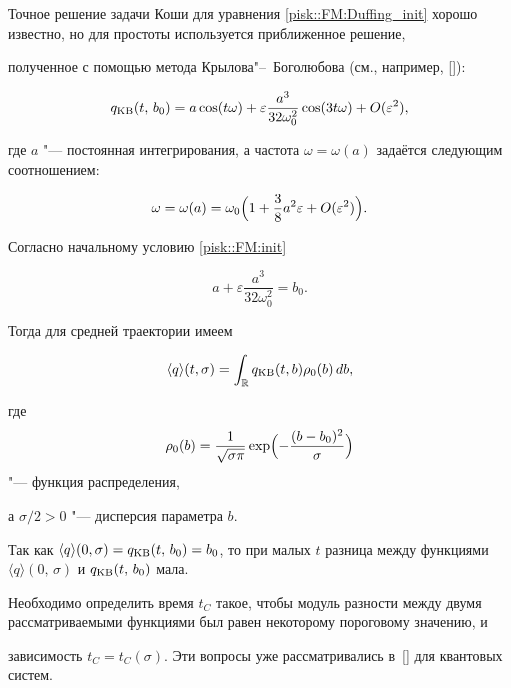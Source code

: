 Точное решение задачи Коши для уравнения \eqref{pisk::FM:Duffing_init} хорошо известно, но для простоты используется приближенное решение,

полученное с помощью метода Крылова"--~Боголюбова (см., например, []):

$$

q_{\rm KB}(t,\, b_0) = a\cos(t \omega) + \varepsilon \dfrac{a^3}{32\omega_0^2}\cos(3 t \omega) + O(\varepsilon^2),

$$

где $a$ "--- постоянная интегрирования, а частота $\omega = \omega (a)$ задаётся следующим соотношением:

$$

\omega=\omega(a) = \omega_0\Bigl(1+\dfrac3 8 a^2\varepsilon + O(\varepsilon^2)\Bigr).

$$



Согласно начальному условию \eqref{pisk::FM:init}

\begin{equation}

\label{pisk::FM:cubic}

a + \varepsilon \dfrac{a^3}{32\omega_0^2} = b_0.

\end{equation}

Тогда для средней траектории имеем

\begin{equation}

\label{pisk::FM:FM_mean}

\langle q\rangle(t,\sigma) = \int_{\mathbb{R}} q_{\rm KB}(t, b) \rho_0(b)\, db,

\end{equation}

где $$\rho_0(b)=\frac{1}{\sqrt{\sigma \pi}} \exp\Bigl({-\frac{(b-b_0)^2}{\sigma}}\Bigr)$$ "--- функция распределения, 

а $\sigma / 2 > 0$ "--- дисперсия параметра $b$.



Так как $\langle q\rangle(0,\sigma) = q_{\rm KB}(t,\, b_0) = b_0$, то при малых $t$ разница между функциями $\langle q\rangle(0,\,\sigma)$ и $q_{\rm KB}(t,\, b_0)$ мала.

Необходимо определить время $t_C$ такое, чтобы модуль разности между двумя рассматриваемыми функциями был равен некоторому пороговому значению, и

зависимость $t_C=t_C(\sigma)$. Эти вопросы уже рассматривались в~[] для квантовых систем.



